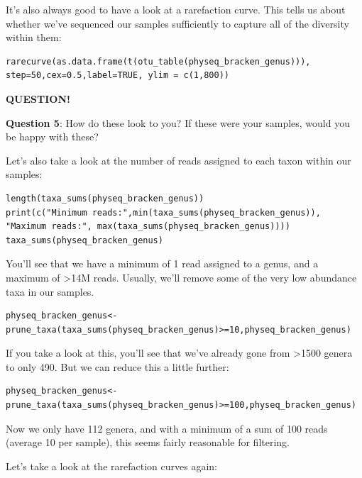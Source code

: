 \documentclass[
]{book}
\newenvironment{bluebox}{
  \definecolor{shadecolor}{RGB}{172, 210, 237}
  \color{white}
  \begin{shaded}}
 {\end{shaded}}
\begin{document}
It's also always good to have a look at a rarefaction curve. This tells us about whether we've sequenced our samples sufficiently to capture all of the diversity within them:

\begin{verbatim}
rarecurve(as.data.frame(t(otu_table(physeq_bracken_genus))), step=50,cex=0.5,label=TRUE, ylim = c(1,800))
\end{verbatim}

\begin{bluebox}

\begin{center}
\textbf{QUESTION!}

\end{center}

\textbf{Question 5}: How do these look to you? If these were your samples, would you be happy with these?

\end{bluebox}

Let's also take a look at the number of reads assigned to each taxon within our samples:

\begin{verbatim}
length(taxa_sums(physeq_bracken_genus))
print(c("Minimum reads:",min(taxa_sums(physeq_bracken_genus)), "Maximum reads:", max(taxa_sums(physeq_bracken_genus))))
taxa_sums(physeq_bracken_genus)
\end{verbatim}

You'll see that we have a minimum of 1 read assigned to a genus, and a maximum of \textgreater14M reads. Usually, we'll remove some of the very low abundance taxa in our samples.

\begin{verbatim}
physeq_bracken_genus<-prune_taxa(taxa_sums(physeq_bracken_genus)>=10,physeq_bracken_genus)
\end{verbatim}

If you take a look at this, you'll see that we've already gone from \textgreater1500 genera to only 490. But we can reduce this a little further:

\begin{verbatim}
physeq_bracken_genus<-prune_taxa(taxa_sums(physeq_bracken_genus)>=100,physeq_bracken_genus)
\end{verbatim}

Now we only have 112 genera, and with a minimum of a sum of 100 reads (average 10 per sample), this seems fairly reasonable for filtering.

Let's take a look at the rarefaction curves again:
\end{document}
